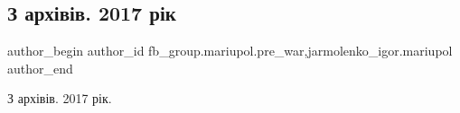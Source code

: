  
 
 
 
 

\subsection{З архівів. 2017 рік}
\label{sec:16_01_2023.fb.fb_group.mariupol.pre_war.2.z_arkh_v_v__2017_r_k}
 
\ifcmt
 author_begin
   author_id fb_group.mariupol.pre_war,jarmolenko_igor.mariupol
 author_end
\fi

З архівів. 2017 рік.
